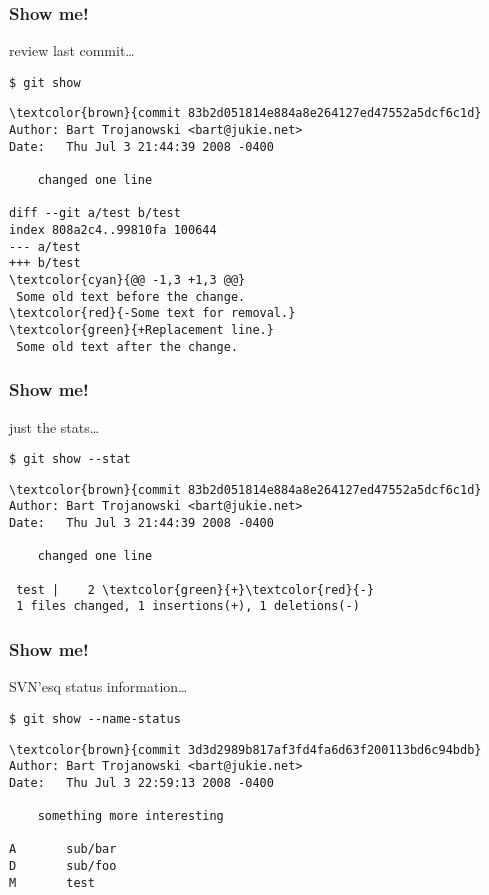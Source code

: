 \documentclass[english]{beamer}
\newcommand{\CMD}[1]{%
\texttt{\textcolor{code-green}{#1}}%
}
\begin{document}
\begin{frame}[fragile]
\frametitle{Show me!}

review last commit\ldots
\vspace{\baselineskip}

\CMD{\$ git show}
{\small
\begin{Verbatim}[commandchars=\\\{\}]
\textcolor{brown}{commit 83b2d051814e884a8e264127ed47552a5dcf6c1d}
Author: Bart Trojanowski <bart@jukie.net>
Date:   Thu Jul 3 21:44:39 2008 -0400

    changed one line

diff --git a/test b/test
index 808a2c4..99810fa 100644
--- a/test
+++ b/test
\textcolor{cyan}{@@ -1,3 +1,3 @@}
 Some old text before the change.
\textcolor{red}{-Some text for removal.}
\textcolor{green}{+Replacement line.}
 Some old text after the change.
\end{Verbatim}
}
\vspace{\textheight}
\end{frame}

\begin{frame}[fragile]
\frametitle{Show me!}

just the stats\ldots
\vspace{\baselineskip}

\CMD{\$ git show {-}-stat}
{\small
\begin{Verbatim}[commandchars=\\\{\}]
\textcolor{brown}{commit 83b2d051814e884a8e264127ed47552a5dcf6c1d}
Author: Bart Trojanowski <bart@jukie.net>
Date:   Thu Jul 3 21:44:39 2008 -0400

    changed one line

 test |    2 \textcolor{green}{+}\textcolor{red}{-}
 1 files changed, 1 insertions(+), 1 deletions(-)
\end{Verbatim}
}
\vspace{\textheight}
\end{frame}

\begin{frame}[fragile]
\frametitle{Show me!}

SVN'esq status information\ldots
\vspace{\baselineskip}

\CMD{\$ git show {-}-name-status}
{\small
\begin{Verbatim}[commandchars=\\\{\}]
\textcolor{brown}{commit 3d3d2989b817af3fd4fa6d63f200113bd6c94bdb}
Author: Bart Trojanowski <bart@jukie.net>
Date:   Thu Jul 3 22:59:13 2008 -0400

    something more interesting

A       sub/bar
D       sub/foo
M       test
\end{Verbatim}
}
\vspace{\textheight}
\end{frame}
\end{document}
